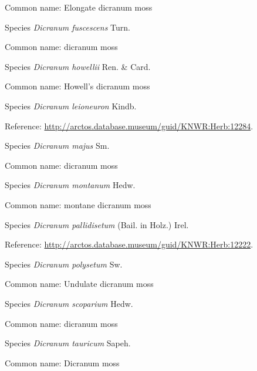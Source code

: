 \documentclass[9pt, article]{memoir}
\begin{document}
\begin{multicols}{2}
Common name: Elongate dicranum moss

\vspace{6pt}\noindent\hspace{36pt}Species \textit{Dicranum fuscescens} Turn.


Common name: dicranum moss

\vspace{6pt}\noindent\hspace{36pt}Species \textit{Dicranum howellii} Ren. \& Card.


Common name: Howell's dicranum moss

\vspace{6pt}\noindent\hspace{36pt}Species \textit{Dicranum leioneuron} Kindb.


Reference: 
\url{http://arctos.database.museum/guid/KNWR:Herb:12284}.

\vspace{6pt}\noindent\hspace{36pt}Species \textit{Dicranum majus} Sm.


Common name: dicranum moss

\vspace{6pt}\noindent\hspace{36pt}Species \textit{Dicranum montanum} Hedw.


Common name: montane dicranum moss

\vspace{6pt}\noindent\hspace{36pt}Species \textit{Dicranum pallidisetum} (Bail. in Holz.) Irel.


Reference: 
\url{http://arctos.database.museum/guid/KNWR:Herb:12222}.

\vspace{6pt}\noindent\hspace{36pt}Species \textit{Dicranum polysetum} Sw.


Common name: Undulate dicranum moss

\vspace{6pt}\noindent\hspace{36pt}Species \textit{Dicranum scoparium} Hedw.


Common name: dicranum moss

\vspace{6pt}\noindent\hspace{36pt}Species \textit{Dicranum tauricum} Sapeh.


Common name: Dicranum moss


\end{multicols}
\end{document}

